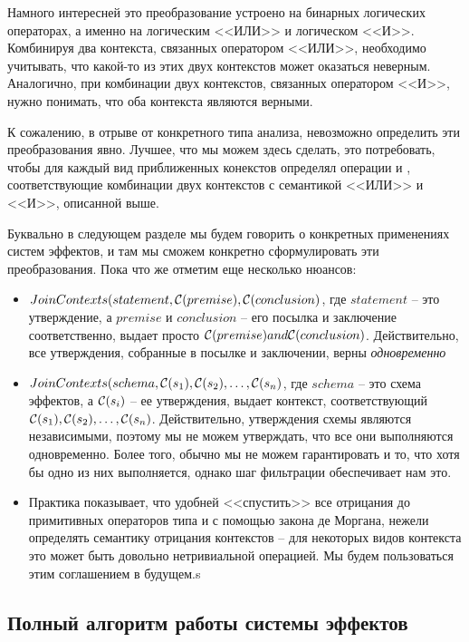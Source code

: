 Намного интересней это преобразование устроено на бинарных логических операторах, а именно на логическим <<ИЛИ>> и логическом <<И>>. Комбинируя два контекста, связанных оператором <<ИЛИ>>, необходимо учитывать, что какой-то из этих двух контекстов может оказаться неверным. Аналогично, при комбинации двух контекстов, связанных оператором <<И>>, нужно понимать, что оба контекста являются верными.

К сожалению, в отрыве от конкретного типа анализа, невозможно определить эти преобразования явно. Лучшее, что мы можем здесь сделать, это потребовать, чтобы для каждый вид приближенных конекстов определял операции  и , соответствующие комбинации двух контекстов с семантикой <<ИЛИ>> и <<И>>, описанной выше.

Буквально в следующем разделе мы будем говорить о конкретных применениях систем эффектов, и там мы сможем конкретно сформулировать эти преобразования. Пока что же отметим еще несколько нюансов:

\begin{itemize}
  \item $JoinContexts(statement, \mathcal{C}(premise), \mathcal{C}(conclusion)$, где $statement$ -- это утверждение, а $premise$ и $conclusion$ -- его посылка и заключение соответственно, выдает просто $\mathcal{C}(premise) and \mathcal{C}(conclusion)$. Действительно, все утверждения, собранные в посылке и заключении, верны \emph{одновременно}

  \item $JoinContexts(schema, \mathcal{C}(s_1), \mathcal{C}(s_2), \ldots, \mathcal{C}(s_n)$, где $schema$ -- это схема эффектов, а $\mathcal{C}(s_i)$ -- ее утверждения, выдает контекст, соответствующий $\mathcal{C}(s_1), \mathcal{C}(s_2), \ldots, \mathcal{C}(s_n)$. Действительно, утверждения схемы являются независимыми, поэтому мы не можем утверждать, что все они выполняются одновременно. Более того, обычно мы не можем гарантировать и то, что хотя бы одно из них выполняется, однако шаг фильтрации обеспечивает нам это.

  \item Практика показывает, что удобней <<спустить>> все отрицания до примитивных операторов типа  и \code{!=} с помощью закона де Моргана, нежели определять семантику отрицания контекстов -- для некоторых видов контекста это может быть довольно нетривиальной операцией. Мы будем пользоваться этим соглашением в будущем.s
\end{itemize}




\subsection{Полный алгоритм работы системы эффектов}

